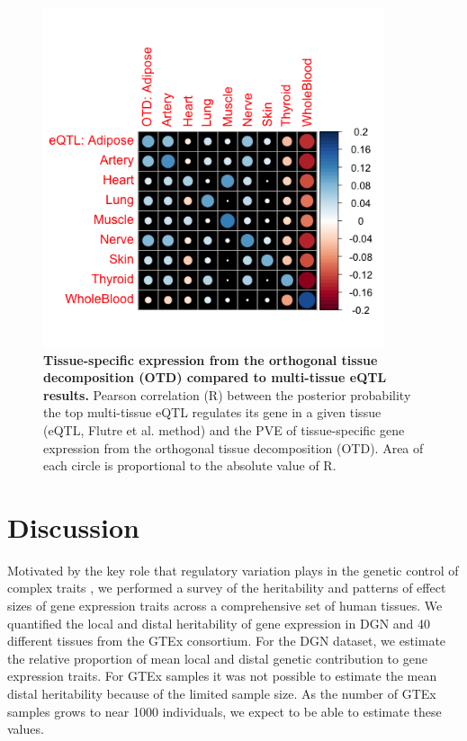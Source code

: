 \documentclass[10pt,letterpaper]{article}
\begin{document}
\begin{figure}[h]
\includegraphics[width=10cm]{Figures/Fig-cor-StephensPr-OTDtsPVE.png}
\caption{{\bf Tissue-specific expression from the 
orthogonal tissue decomposition (OTD) compared to multi-tissue eQTL results.} 
Pearson correlation (R) between the 
posterior probability the top multi-tissue eQTL regulates its gene in a given tissue (eQTL, 
Flutre et al. method) and the PVE of tissue-specific gene expression from the orthogonal
tissue decomposition (OTD). Area of each circle is proportional to the absolute value of R.}
\label{fig-corrplot}
\end{figure}



\section*{Discussion}
Motivated by the key role that regulatory variation plays in the genetic control of complex traits \cite{Nicolae_2010,Nica_2010,Gusev_2014}, we performed a survey of the heritability and patterns of effect sizes of gene expression traits across a comprehensive set of human tissues. We quantified the local and distal heritability of gene expression in DGN and 40 different tissues from the GTEx consortium. For the DGN dataset, we estimate the relative proportion of mean local and distal genetic contribution to gene expression traits. For GTEx samples it was not possible to estimate the mean distal heritability because of the limited sample size. As the number of GTEx samples grows to near 1000 individuals, we expect to be able to estimate these values.
\end{document}
